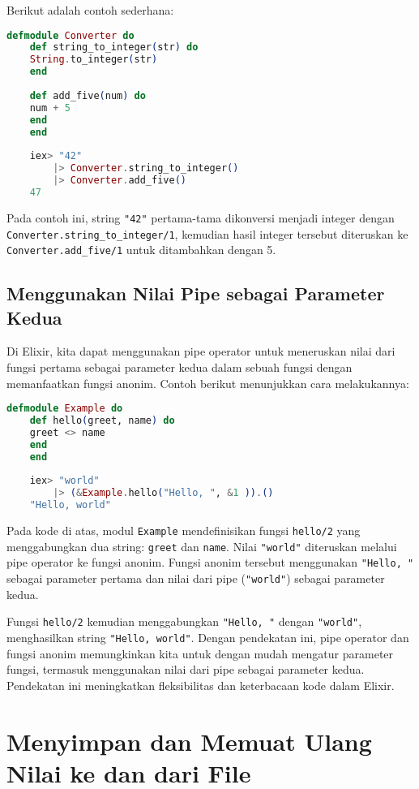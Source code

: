 Berikut adalah contoh sederhana:

\begin{lstlisting}[language=Elixir]
	defmodule Converter do
	def string_to_integer(str) do
	String.to_integer(str)
	end
	
	def add_five(num) do
	num + 5
	end
	end
	
	iex> "42"
		|> Converter.string_to_integer()
		|> Converter.add_five()
	47
\end{lstlisting}

Pada contoh ini, string \texttt{"42"} pertama-tama dikonversi menjadi integer dengan \texttt{Converter.string\_to\_integer/1}, kemudian hasil integer tersebut diteruskan ke \texttt{Converter.add\_five/1} untuk ditambahkan dengan 5.

\subsection{Menggunakan Nilai Pipe sebagai Parameter Kedua}

Di Elixir, kita dapat menggunakan pipe operator untuk meneruskan nilai dari fungsi pertama sebagai parameter kedua dalam sebuah fungsi dengan memanfaatkan fungsi anonim. Contoh berikut menunjukkan cara melakukannya:

\begin{lstlisting}[language=Elixir]
	defmodule Example do
	def hello(greet, name) do
	greet <> name
	end
	end
	
	iex> "world"
		|> (&Example.hello("Hello, ", &1 )).()
	"Hello, world"
\end{lstlisting}

Pada kode di atas, modul \texttt{Example} mendefinisikan fungsi \texttt{hello/2} yang menggabungkan dua string: \texttt{greet} dan \texttt{name}. Nilai \texttt{"world"} diteruskan melalui pipe operator ke fungsi anonim. Fungsi anonim tersebut menggunakan \texttt{"Hello, "} sebagai parameter pertama dan nilai dari pipe (\texttt{"world"}) sebagai parameter kedua. 

Fungsi \texttt{hello/2} kemudian menggabungkan \texttt{"Hello, "} dengan \texttt{"world"}, menghasilkan string \texttt{"Hello, world"}. Dengan pendekatan ini, pipe operator dan fungsi anonim memungkinkan kita untuk dengan mudah mengatur parameter fungsi, termasuk menggunakan nilai dari pipe sebagai parameter kedua. Pendekatan ini meningkatkan fleksibilitas dan keterbacaan kode dalam Elixir.

\section{Menyimpan dan Memuat Ulang Nilai ke dan dari File}

